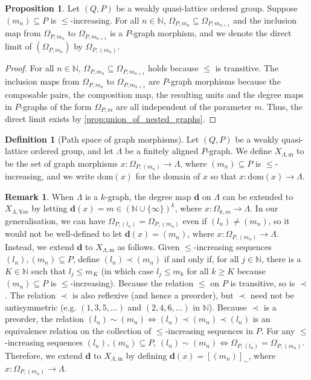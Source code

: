\documentclass[11pt]{amsart}
\theoremstyle{definition}
\numberwithin{thm}{section}
\numberwithin{equation}{section}
\newtheorem{definition}[thm]{Definition}
\newtheorem{proposition}[thm]{Proposition}
\newtheorem{remark}[thm]{Remark}
\newcommand{\N}{\mathbb{N}}
\newcommand{\degree}{\mathbf{d}}
\newcommand{\morphdom}[1]{\mathrm{dom}(#1)}
\newcommand{\ofYeend}{\mathrm{Yee}}
\newcommand{\M}{\mathrm{m}}
\newcommand{\PS}[2]{X_{#2, #1}}
\begin{document}
\begin{proposition}
\label{prop:increasing_sequences_in_P_yield_nested_P_graphs}
Let $(Q, P)$ be a weakly quasi-lattice ordered group.
Suppose $(m_n) \subseteq P$ is $\leq$-increasing.
For all $n \in \N$, $\Omega_{P, m_n} \subseteq \Omega_{P, m_{n+1}}$ and the inclusion map from $\Omega_{P, m_n}$ to $\Omega_{P, m_{n+1}}$ is a $P$-graph morphism, and we denote the direct limit of $(\Omega_{P, m_n})$ by $\Omega_{P, (m_n)}$.
\end{proposition}
\begin{proof}
For all $n \in \N$, $\Omega_{P, m_n} \subseteq \Omega_{P, m_{n+1}}$ holds because $\leq$ is transitive.
The inclusion maps from $\Omega_{P, m_n}$ to $\Omega_{P, m_{n+1}}$ are $P$-graph morphisms because the composable pairs, the composition map, the resulting units and the degree maps in $P$-graphs of the form $\Omega_{P, m}$ are all independent of the parameter $m$.
Thus, the direct limit exists by \cref{prop:union_of_nested_graphs}.
\end{proof}

\begin{definition}[Path space of graph morphisms]
\label{def:PSmorph}
Let $(Q, P)$ be a weakly quasi-lattice ordered group, and let $\Lambda$ 
be a finitely aligned $P$-graph. 
We define $\PS{\M}{\Lambda}$ to be the set of graph morphisms $x \colon \Omega_{P, (m_n)} \to \Lambda$, where $(m_n) \subseteq P$ is $\leq$-increasing, and we write $\morphdom{x}$ for the domain of $x$ so that $x \colon \morphdom{x} \to \Lambda$.
\end{definition}    

\begin{remark}
\label{rem:extending_degree_map}
When $\Lambda$ is a $k$-graph, the degree map $\degree$ on $\Lambda$ can be extended to $\PS{\ofYeend}{\Lambda}$ by letting $\degree(x) = m \in (\N \cup \{\infty\})^k$, where $x \colon \Omega_{k, m} \to \Lambda$.
In our generalisation, we can have $\Omega_{P, (l_n)} = \Omega_{P, (m_n)}$ even if $(l_n) \neq (m_n)$, so it would not be well-defined to let $\degree(x) = (m_n)$, where $x \colon \Omega_{P, (m_n)} \to \Lambda$.
Instead, we extend $\degree$ to $\PS{\M}{\Lambda}$ as follows.
Given $\leq$-increasing sequences $(l_n), (m_n) \subseteq P$, define $(l_n) \prec (m_n)$ if and only if, for all $j \in \N$, there is a $K \in \N$ such that $l_j \leq m_K$ (in which case $l_j \leq m_k$ for all $k \geq K$ because $(m_n) \subseteq P$ is $\leq$-increasing).
Because the relation $\leq$ on $P$ is transitive, so is $\prec$.
The relation $\prec$ is also reflexive (and hence a preorder), but $\prec$ need not be antisymmetric (e.g. $(1, 3, 5, \dots)$ and $(2, 4, 6, \dots)$ in $\N$).
Because $\prec$ is a preorder, the relation $(l_n) \sim (m_n) \iff (l_n) \prec (m_n) \prec (l_n)$ is an equivalence relation on the collection of $\leq$-increasing sequences in $P$.
For any $\leq$-increasing sequences $(l_n), (m_n) \subseteq P$, $(l_n) \sim (m_n) \iff \Omega_{P, (l_n)} = \Omega_{P, (m_n)}$.
Therefore, we extend $\degree$ to $\PS{\M}{\Lambda}$ by defining $\degree(x) = [(m_n)]_\sim$, where $x \colon \Omega_{P, (m_n)} \to \Lambda$.
\end{remark}
\end{document}
